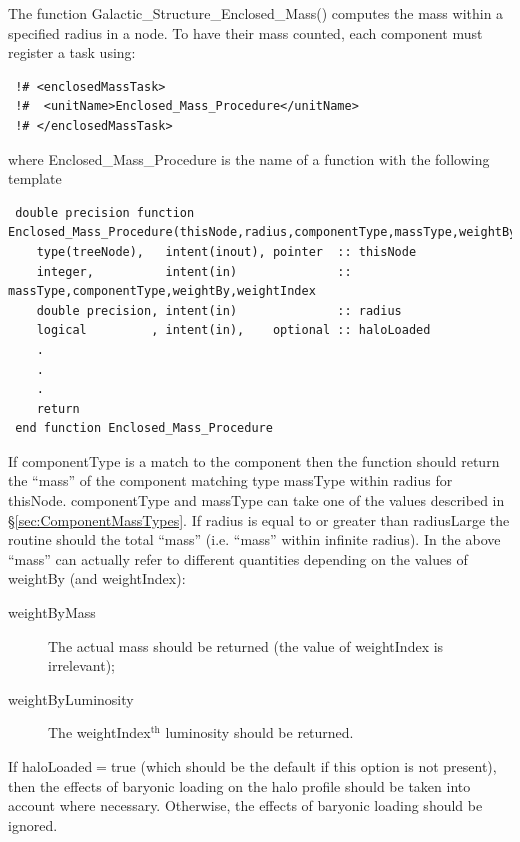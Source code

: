 The function {\normalfont \ttfamily Galactic\_Structure\_Enclosed\_Mass()} computes the mass within a specified radius in a node. To have their mass counted, each component must register a task using:
\begin{verbatim}
 !# <enclosedMassTask>
 !#  <unitName>Enclosed_Mass_Procedure</unitName>
 !# </enclosedMassTask>
\end{verbatim}
where {\normalfont \ttfamily Enclosed\_Mass\_Procedure} is the name of a function with the following template
\begin{verbatim}
 double precision function Enclosed_Mass_Procedure(thisNode,radius,componentType,massType,weightBy,weightIndex,haloLoaded)
    type(treeNode),   intent(inout), pointer  :: thisNode
    integer,          intent(in)              :: massType,componentType,weightBy,weightIndex
    double precision, intent(in)              :: radius
    logical         , intent(in),    optional :: haloLoaded
    .
    .
    .
    return
 end function Enclosed_Mass_Procedure
\end{verbatim}
If {\normalfont \ttfamily componentType} is a match to the component then the function should return the ``mass'' of the component matching type {\normalfont \ttfamily massType} within {\normalfont \ttfamily radius} for {\normalfont \ttfamily thisNode}.  {\normalfont \ttfamily componentType} and {\normalfont \ttfamily massType} can take one of the values described in \S\ref{sec:ComponentMassTypes}.
If {\normalfont \ttfamily radius} is equal to or greater than {\normalfont \ttfamily radiusLarge} the routine should the total ``mass'' (i.e. ``mass'' within infinite radius). In the above ``mass'' can actually refer to different quantities depending on the values of {\normalfont \ttfamily weightBy} (and {\normalfont \ttfamily weightIndex}):
\begin{description}
\item [{\normalfont \ttfamily weightByMass}] The actual mass should be returned (the value of {\normalfont \ttfamily weightIndex} is irrelevant);
\item [{\normalfont \ttfamily weightByLuminosity}] The {\normalfont \ttfamily weightIndex}$^\mathrm{th}$ luminosity should be returned.
\end{description}
If {\normalfont \ttfamily haloLoaded}$=${\normalfont \ttfamily true} (which should be the default if this option is not present), then the effects of baryonic loading on the halo profile should be taken into account where necessary. Otherwise, the effects of baryonic loading should be ignored.

